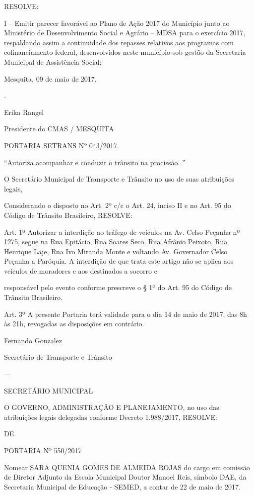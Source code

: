 \documentclass{doliberto}
\begin{document}
RESOLVE: 
 
I  –  Emitir  parecer  favorável  ao  Plano  de  Ação  2017  do 
Município junto ao Ministério de Desenvolvimento Social e 
Agrário – MDSA para o exercício 2017, respaldando assim a 
continuidade  dos  repasses  relativos  aos  programas  com 
cofinanciamento federal, desenvolvidos neste município sob  
gestão da Secretaria Municipal de Assistência Social;  
 
Mesquita, 09 de maio de 2017.  
 
 
.  

Erika Rangel 

Presidente do CMAS / MESQUITA 

 

PORTARIA SETRANS Nº 043/2017.                           
 
 

“Autoriza acompanhar e conduzir o trânsito na procissão. ”  

 
O Secretário Municipal de Transporte e Trânsito no uso 
de suas atribuições legais,  
 
Considerando o disposto no Art. 2º c/c o Art. 24, inciso II e 
no Art. 95 do Código de Trânsito Brasileiro,  
RESOLVE:  
 
Art. 1º Autorizar a interdição ao tráfego de veículos na Av. 
Celso Peçanha  nº 1275, segue  na Rua Epitácio, Rua Soares 
Seco,  Rua  Afrânio  Peixoto,  Rua  Henrique  Laje,  Rua  Ivo 
Miranda Monte e voltando Av. Governador Celso Peçanha a 
Paróquia. A interdição de que trata este artigo não se aplica 
aos  veículos  de  moradores  e  aos  destinados  a  socorro  e 
 

responsável pelo evento conforme prescreve o § 1º do 
Art. 95 do Código de Trânsito Brasileiro.  
 
Art. 3º A presente Portaria terá validade para o dia 14 de 
maio de 2017, das 8h às 21h, revogadas as disposições em 
contrário. 
 
 

Fernando Gonzalez 

Secretário de Transporte e Trânsito 

---

SECRETÁRIO  MUNICIPAL 

 
O 
GOVERNO, 
ADMINISTRAÇÃO  E  PLANEJAMENTO,  no  uso  das 
atribuições legais delegadas conforme Decreto 1.988/2017, 
RESOLVE: 
 
DE 

PORTARIA Nº 550/2017 
 
Nomear  SARA  QUENIA  GOMES  DE  ALMEIDA  ROJAS  do 
cargo  em  comissão  de  Diretor  Adjunto  da  Escola 
Municipal  Doutor  Manoel  Reis,  símbolo  DAE,  da 
Secretaria Municipal de Educação - SEMED, a contar de 22 
de maio de 2017. 
 
\end{document}

